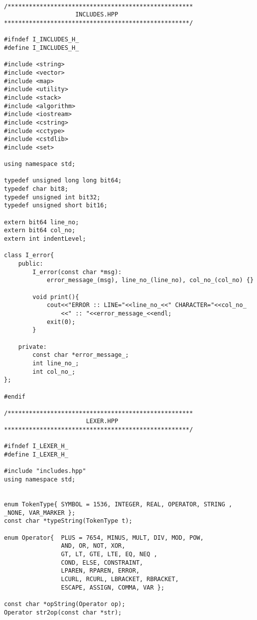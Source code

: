\documentclass[pdftex,12pt,letterpaper,notitlepage,twoside]{article}
\begin{document}
\lstset{language=[ANSI]C,stepnumber=1,numbers=left,numbersep=1cm,basicstyle=\footnotesize}
\begin{lstlisting}[frame=single,caption={C program for testing}]

/****************************************************
                    INCLUDES.HPP
****************************************************/

#ifndef I_INCLUDES_H_
#define I_INCLUDES_H_

#include <string>
#include <vector>
#include <map>
#include <utility>
#include <stack>
#include <algorithm>
#include <iostream>
#include <cstring>
#include <cctype>
#include <cstdlib>
#include <set>

using namespace std;

typedef unsigned long long bit64;
typedef char bit8;
typedef unsigned int bit32;
typedef unsigned short bit16;

extern bit64 line_no;
extern bit64 col_no;
extern int indentLevel;

class I_error{
    public:
        I_error(const char *msg):
            error_message_(msg), line_no_(line_no), col_no_(col_no) {}
            
        void print(){
            cout<<"ERROR :: LINE="<<line_no_<<" CHARACTER="<<col_no_
                <<" :: "<<error_message_<<endl;
            exit(0);
        }
        
    private:
        const char *error_message_;
        int line_no_;
        int col_no_; 
};

#endif

/****************************************************
                       LEXER.HPP
****************************************************/

#ifndef I_LEXER_H_
#define I_LEXER_H_

#include "includes.hpp"
using namespace std;


enum TokenType{ SYMBOL = 1536, INTEGER, REAL, OPERATOR, STRING , _NONE, VAR_MARKER };
const char *typeString(TokenType t);

enum Operator{  PLUS = 7654, MINUS, MULT, DIV, MOD, POW,
                AND, OR, NOT, XOR,
                GT, LT, GTE, LTE, EQ, NEQ , 
                COND, ELSE, CONSTRAINT,
                LPAREN, RPAREN, ERROR, 
                LCURL, RCURL, LBRACKET, RBRACKET,
                ESCAPE, ASSIGN, COMMA, VAR };

const char *opString(Operator op);
Operator str2op(const char *str);


\end{lstlisting}
\end{document}
